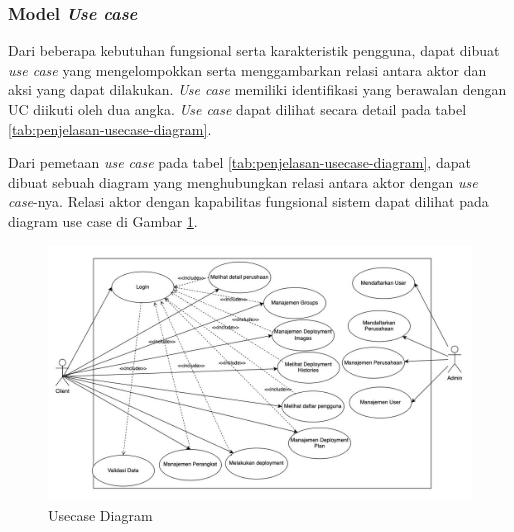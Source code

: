 \subsubsection{Model \textit{Use case}}
\label{subsec:model-usecase}
Dari beberapa kebutuhan fungsional serta karakteristik pengguna, dapat dibuat \textit{use case} yang mengelompokkan serta menggambarkan relasi antara aktor dan aksi yang dapat dilakukan. \textit{Use case} memiliki identifikasi yang berawalan dengan UC diikuti oleh dua angka. \textit{Use case} dapat dilihat secara detail pada tabel \ref{tab:penjelasan-usecase-diagram}.

Dari pemetaan \textit{use case} pada tabel \ref{tab:penjelasan-usecase-diagram}, dapat dibuat sebuah diagram yang menghubungkan relasi antara aktor dengan \textit{use case}-nya. Relasi  aktor dengan kapabilitas fungsional sistem dapat dilihat pada diagram use case di Gambar \ref{fig:usecase-diagram}.

\begin{figure}[ht]
  \centering
  \includegraphics[width=1\textwidth]{resources/chapter-3/usecase-diagram.jpg}
  \caption{Usecase Diagram}
  \label{fig:usecase-diagram}
\end{figure}

\pagebreak